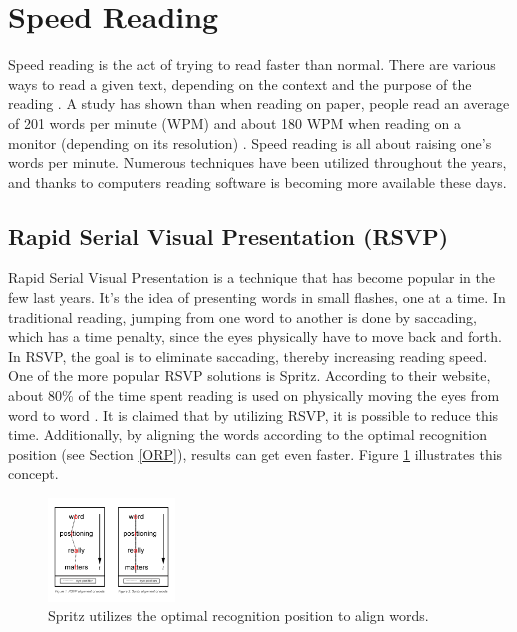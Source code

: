 \section{Speed Reading}
Speed reading is the act of trying to read faster than normal. There are various ways to read a given text, depending on the context and the purpose of the reading \cite{differentWaysOfReading}. A study has shown than when reading on paper, people read an average of 201 words per minute (WPM) and about 180 WPM when reading on a monitor (depending on its resolution) \cite{ziefle_effects_1998}. Speed reading is all about raising one's words per minute. Numerous techniques have been utilized throughout the years, and  thanks to computers reading software is becoming more available these days.


\subsection{Rapid Serial Visual Presentation (RSVP)}
Rapid Serial Visual Presentation is a technique that has become popular in the few last years. It's the idea of presenting words in small flashes, one at a time. In traditional reading, jumping from one word to another is done by saccading, which has a time penalty, since the eyes physically have to move back and forth. In RSVP, the goal is to eliminate saccading, thereby increasing reading speed. One of the more popular RSVP solutions is Spritz. According to their website, about 80\% of the time spent reading is used on physically moving the eyes from word to word \cite{spritz}.	It is claimed that by utilizing RSVP, it is possible to reduce this time. Additionally, by aligning the words according to the optimal recognition position (see Section \ref{ORP}), results can get even faster. Figure \ref{fig:spritz_orp} illustrates this concept.

\begin{figure}[htbp]
\centering
\includegraphics[width=0.3\textwidth]{Pics/opr_spritz}
\caption{Spritz utilizes the optimal recognition position to align words.}
\label{fig:spritz_orp}
\end{figure}


